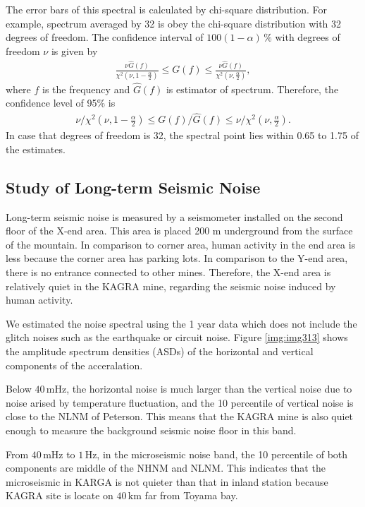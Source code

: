 The error bars of this spectral is calculated by chi-square distribution. For example, spectrum averaged by 32 is obey the chi-square distribution with 32 degrees of freedom. The confidence interval of $100(1-\alpha)\,\%$ with degrees of freedom $\nu$ is given by 
\begin{eqnarray}
  \frac{\nu{\hat{G}(f)}}{\chi^2(\nu,1-\frac{\alpha}{2})} \leq G(f) \leq \frac{\nu{\hat{G}(f)}}{\chi^2(\nu,\frac{\alpha}{2})},
\end{eqnarray}
where $f$ is the frequency and $\hat{G}(f)$ is estimator of spectrum. Therefore, the confidence level of 95\% is 
\begin{eqnarray}
  \nu/\chi^2(\nu,1-\frac{\alpha}{2}) \leq G(f)/\hat{G}(f) \leq \nu/\chi^2(\nu,\frac{\alpha}{2}).
\end{eqnarray}
In case that degrees of freedom is 32, the spectral point lies within 0.65 to 1.75 of the estimates.

\subsection{Study of Long-term Seismic Noise}
Long-term seismic noise is measured by a seismometer installed on the second floor of the X-end area. This area is placed 200 $\mathrm{m}$ underground from the surface of the mountain. In comparison to corner area, human activity in the end area is less because the corner area has parking lots. In comparison to the Y-end area, there is no entrance connected to other mines. Therefore, the X-end area is relatively quiet in the KAGRA mine, regarding the seismic noise induced by human activity. 

We estimated the noise spectral using the 1 year data which does not include the glitch noises such as the earthquake or circuit noise. Figure \ref{img:img313} shows the amplitude spectrum densities (ASDs) of the horizontal and vertical components of the acceralation.

Below $40\,\mathrm{mHz}$, the horizontal noise is much larger than the vertical noise due to noise arised by temperature fluctuation, and the 10 percentile of vertical noise is close to the NLNM of Peterson. This means that the KAGRA mine is also quiet enough to measure the background seismic noise floor in this band.

From $40\,\mathrm{mHz}$ to $1\,\mathrm{Hz}$, in the microseismic noise band, the 10 percentile of both components are middle of the NHNM and NLNM. This indicates that the microseismic in KARGA is not quieter than that in inland station because KAGRA site is locate on $40\,\mathrm{km}$ far from Toyama bay. 

